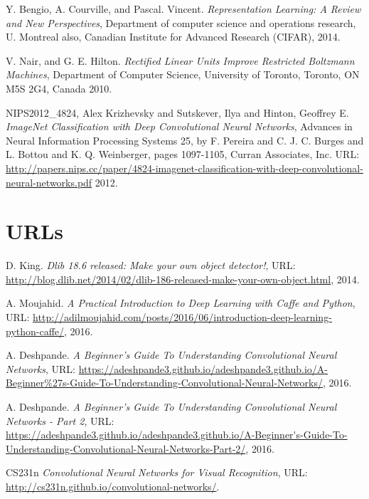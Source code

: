 \documentclass[a4paper,11pt]{book}
\begin{document}
\begin{thebibliography}{99}
	Y. Bengio, A. Courville, and Pascal. Vincent. %
	\textit{Representation Learning: A Review and New Perspectives}, %
	Department of computer science and operations research, U. Montreal 
	also, Canadian Institute for Advanced Research (CIFAR),
	2014.	%
	
	V. Nair, and G. E. Hilton. %
	\textit{Rectified Linear Units Improve Restricted Boltzmann Machines}, %
	Department of Computer Science, University of Toronto, Toronto, ON M5S 2G4, Canada
	2010.	%
	
	NIPS2012\_4824,
	Alex Krizhevsky and Sutskever, Ilya and Hinton, Geoffrey E. %
	\textit{ImageNet Classification with Deep Convolutional Neural Networks}, %
	Advances in Neural Information Processing Systems 25, by %
	F. Pereira and C. J. C. Burges and L. Bottou and K. Q. Weinberger, pages 1097-1105,%
	Curran Associates, Inc.
	URL: \url{http://papers.nips.cc/paper/4824-imagenet-classification-with-deep-convolutional-neural-networks.pdf}
	2012.	%
	
	\section{URLs}
	D. King. 
	\textit{Dlib 18.6 released: Make your own object detector!}, 
	URL: \url{http://blog.dlib.net/2014/02/dlib-186-released-make-your-own-object.html}, 
	2014.
	
	A. Moujahid. 
	\textit{A Practical Introduction to Deep Learning with Caffe and Python}, 
	URL: \url{http://adilmoujahid.com/posts/2016/06/introduction-deep-learning-python-caffe/}, 
	2016.
	
	A. Deshpande. 
	\textit{A Beginner's Guide To Understanding Convolutional Neural Networks}, 
	URL: \url{https://adeshpande3.github.io/adeshpande3.github.io/A-Beginner%27s-Guide-To-Understanding-Convolutional-Neural-Networks/}, 
		2016.
		
	A. Deshpande. 
	\textit{A Beginner's Guide To Understanding Convolutional Neural Networks - Part 2}, 
	URL: \url{https://adeshpande3.github.io/adeshpande3.github.io/A-Beginner's-Guide-To-Understanding-Convolutional-Neural-Networks-Part-2/}, 
	2016.
	
	CS231n  
	\textit{Convolutional Neural Networks for Visual Recognition}, 
	URL: \url{http://cs231n.github.io/convolutional-networks/}.
	

\end{thebibliography}
\end{document}
